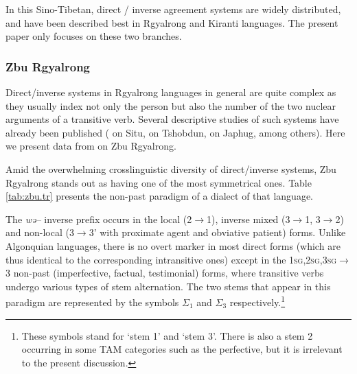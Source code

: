 \documentclass[twoside,a4paper,11pt]{article}
\newcommand{\ipa}[1]{{\phon\textit{#1}}}
\newcommand{\Σ}{\greek{Σ}}
\newcommand{\ra}{$\Sigma_1$}
\newcommand{\rc}{$\Sigma_3$}
\begin{document}
In this Sino-Tibetan,  direct / inverse agreement systems are widely distributed, and have been described best in Rgyalrong and Kiranti languages. The present paper only focuses on these two branches.


\subsubsection{Zbu Rgyalrong}

Direct/inverse systems in Rgyalrong languages in general are quite complex as they usually index not only the person but also the number of the two nuclear arguments of a transitive verb. Several descriptive studies of such systems have already been published (\citealt{delancey81direction} on Situ,  \citealt{jackson02rentongdengdi} on Tshobdun,  \citealt{jacques10inverse} on Japhug, among others). Here we present data from \citealt{gongxun14agreement} on Zbu Rgyalrong.

Amid the overwhelming crosslinguistic diversity of direct/inverse systems, Zbu Rgyalrong stands out as having one of the most symmetrical ones. Table \ref{tab:zbu.tr} presents the non-past paradigm of a dialect of that language.  


The \ipa{wə--} inverse prefix occurs in the local (2$\rightarrow$1), inverse mixed (3$\rightarrow$1, 3$\rightarrow$2) and non-local (3$\rightarrow$3' with proximate agent and obviative patient) forms. Unlike Algonquian languages, there is no overt marker in most direct forms (which are thus identical to the corresponding intransitive ones) except in the \textsc{1sg,2sg,3sg$\rightarrow$3}    non-past   (imperfective, factual, testimonial) forms, where transitive verbs undergo various types of stem alternation. The two stems that appear in this paradigm are represented by the symbols   \ra{} and \rc{} respectively.\footnote{These symbols stand for `stem 1' and `stem 3'. There is also a stem 2 occurring in some TAM categories such as the perfective, but it is irrelevant to the present discussion.}
\end{document}
